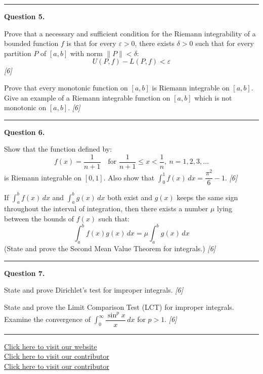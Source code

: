 \documentclass[11pt,a4paper]{article}
\newcommand{\pts}[1]{\hfill   \textit{[#1]}}
\begin{document}
\medskip\rule{\linewidth}{0.2pt}

\medskip


\noindent   \textbf{Question 5.}

\begin{parts}
  \item Prove that a necessary and sufficient condition for the Riemann integrability of a bounded function $f$ is that for every $\varepsilon > 0$, there exists $\delta > 0$ such that for every partition $P$ of $[a, b]$ with norm $\|P\| < \delta$:
  \[
  U(P, f) - L(P, f) < \varepsilon
  \] \pts{6}
  \item Prove that every monotonic function on $[a, b]$ is Riemann integrable on $[a, b]$. Give an example of a Riemann integrable function on $[a, b]$ which is not monotonic on $[a, b]$. \pts{6}
\end{parts}

\medskip\rule{\linewidth}{0.2pt}

\medskip


\noindent   \textbf{Question 6.}

\begin{parts}
  \item Show that the function defined by:
  \[
  f(x) = \frac{1}{n+1} \quad  \text{for } \frac{1}{n+1} \le x < \frac{1}{n},\ n = 1, 2, 3, \dots
  \]
  is Riemann integrable on $[0, 1]$. Also show that $\int_0^1 f(x)\,dx = \dfrac{\pi^2}{6} - 1$. \pts{6}
  \item If $\int_a^b f(x)\,dx$ and $\int_a^b g(x)\,dx$ both exist and $g(x)$ keeps the same sign throughout the interval of integration, then there exists a number $\mu$ lying between the bounds of $f(x)$ such that:
  \[
  \int_a^b f(x)g(x)\,dx = \mu \int_a^b g(x)\,dx
  \]
  (State and prove the Second Mean Value Theorem for integrals.) \pts{6}
\end{parts}

\medskip\rule{\linewidth}{0.2pt}

\medskip


\noindent   \textbf{Question 7.}

\begin{parts}
  \item State and prove Dirichlet's test for improper integrals. \pts{6}
  \item State and prove the Limit Comparison Test (LCT) for improper integrals. Examine the convergence of $\int_0^\infty \dfrac{\sin^p x}{x}\,dx$ for $p > 1$. \pts{6}
\end{parts}

\vfill
\rule{\linewidth}{0.4pt}

\begin{center}\small
  \href{https://bhu-exam.vercel.app/}{Click here to visit our website}\\[4pt]
  \href{https://me-aryan.vercel.app/}{Click here to visit our contributor}\\[4pt]
  \href{https://quashan-me.vercel.app/}{Click here to visit our contributor}
\end{center}
\end{document}
